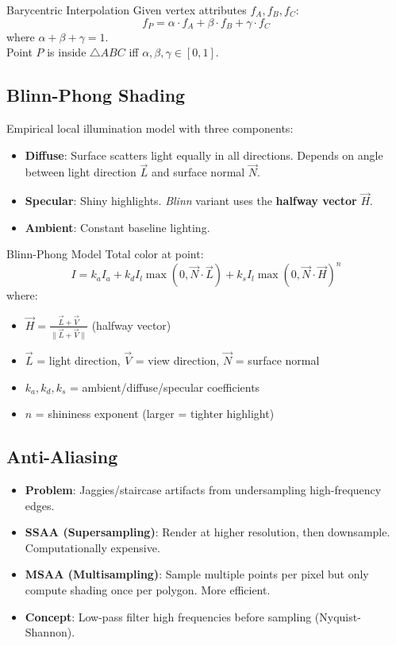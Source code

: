 \documentclass[11pt]{article}
\begin{document}
\begin{formulabox}{Barycentric Interpolation}
Given vertex attributes $f_A, f_B, f_C$:
$$f_P = \alpha \cdot f_A + \beta \cdot f_B + \gamma \cdot f_C$$
where $\alpha + \beta + \gamma = 1$.\\
Point $P$ is inside $\triangle ABC$ iff $\alpha,\beta,\gamma \in [0, 1]$.
\end{formulabox}

\subsection{Blinn-Phong Shading}
Empirical local illumination model with three components:
\begin{itemize}
    \item \textbf{Diffuse}: Surface scatters light equally in all directions. Depends on angle between light direction $\vec{L}$ and surface normal $\vec{N}$.
    \item \textbf{Specular}: Shiny highlights. \textit{Blinn} variant uses the \textbf{halfway vector} $\vec{H}$.
    \item \textbf{Ambient}: Constant baseline lighting.
\end{itemize}

\begin{formulabox}{Blinn-Phong Model}
Total color at point:
$$I = k_a I_a + k_d I_l \max(0, \vec{N} \cdot \vec{L}) + k_s I_l \max(0, \vec{N} \cdot \vec{H})^n$$
where:
\begin{itemize}
    \item $\vec{H} = \frac{\vec{L} + \vec{V}}{\|\vec{L} + \vec{V}\|}$ (halfway vector)
    \item $\vec{L}$ = light direction, $\vec{V}$ = view direction, $\vec{N}$ = surface normal
    \item $k_a, k_d, k_s$ = ambient/diffuse/specular coefficients
    \item $n$ = shininess exponent (larger = tighter highlight)
\end{itemize}
\end{formulabox}

\subsection{Anti-Aliasing}
\begin{itemize}
    \item \textbf{Problem}: Jaggies/staircase artifacts from undersampling high-frequency edges.
    \item \textbf{SSAA (Supersampling)}: Render at higher resolution, then downsample. Computationally expensive.
    \item \textbf{MSAA (Multisampling)}: Sample multiple points per pixel but only compute shading once per polygon. More efficient.
    \item \textbf{Concept}: Low-pass filter high frequencies before sampling (Nyquist-Shannon).
\end{itemize}
\end{document}
